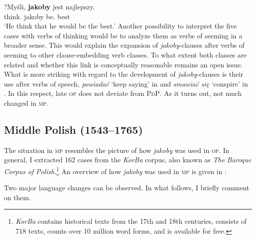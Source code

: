 \documentclass[output=paper
,modfonts
,nonflat]{langsci/langscibook}
\begin{document}
\ea \gll ?Myśli, \textbf{jakoby} jest najlepszy. \label{portugal} \\
		think.{\thirdperson}{\sg} jakoby be.{\thirdperson}{\sg} best \\
\glt	 `He think that he would be the best.'
\z
Another possibility to interpret the five cases with verbs of thinking would be to analyze them as verbs of seeming in a broader sense. This would explain the expansion of \emph{jakoby}-clauses after verbs of seeming to other clause-embedding verb classes. To what extent both classes are related and whether this link is conceptually reasonable remains an open issue. What is more striking with regard to the development of \emph{jakoby}-clauses is their use after verbs of speech, \emph{powiadać} `keep saying' in  and \emph{smawiać się} `conspire' in . In this respect, late \textsc{op} does not deviate from \textsc{PdP}. As it turns out, not much changed in \textsc{mp}.

\subsection{Middle Polish (1543--1765)}

The situation in \textsc{mp} resembles the picture of how \emph{jakoby} was used in \textsc{op}. In general, I extracted 162 cases from the \emph{KorBa} corpus, also known as \emph{The Baroque Corpus of Polish}.\footnote{\emph{KorBa} contains historical texts from the 17th and 18th centuries, consists of 718 texts, counts over 10 million word forms, and is available for free.
}
An overview of how \emph{jakoby} was used in \textsc{mp} is given in :

\begin{table}[h]
\caption{The use of \emph{jakoby} in the \emph{KorBa} corpus} \label{mlodopolski_statystka}
\end{table}

\noindent  Two major language changes can be observed. In what follows, I briefly comment on them.
\end{document}
